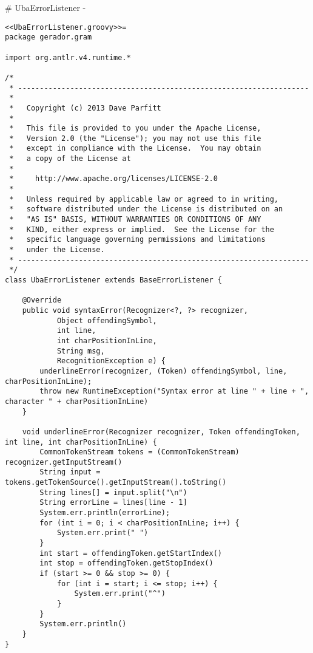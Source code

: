 # UbaErrorListener {-}

\begin{lstlisting}[style=java]
<<UbaErrorListener.groovy>>=
package gerador.gram

import org.antlr.v4.runtime.*

/*
 * -------------------------------------------------------------------
 *
 *   Copyright (c) 2013 Dave Parfitt
 *
 *   This file is provided to you under the Apache License,
 *   Version 2.0 (the "License"); you may not use this file
 *   except in compliance with the License.  You may obtain
 *   a copy of the License at
 *
 *     http://www.apache.org/licenses/LICENSE-2.0
 *
 *   Unless required by applicable law or agreed to in writing,
 *   software distributed under the License is distributed on an
 *   "AS IS" BASIS, WITHOUT WARRANTIES OR CONDITIONS OF ANY
 *   KIND, either express or implied.  See the License for the
 *   specific language governing permissions and limitations
 *   under the License.
 * -------------------------------------------------------------------
 */
class UbaErrorListener extends BaseErrorListener {

    @Override
    public void syntaxError(Recognizer<?, ?> recognizer,
            Object offendingSymbol,
            int line,
            int charPositionInLine,
            String msg,
            RecognitionException e) {
        underlineError(recognizer, (Token) offendingSymbol, line, charPositionInLine);
        throw new RuntimeException("Syntax error at line " + line + ", character " + charPositionInLine)
    }

    void underlineError(Recognizer recognizer, Token offendingToken, int line, int charPositionInLine) {
        CommonTokenStream tokens = (CommonTokenStream) recognizer.getInputStream()
        String input = tokens.getTokenSource().getInputStream().toString()
        String lines[] = input.split("\n")
        String errorLine = lines[line - 1]
        System.err.println(errorLine);
        for (int i = 0; i < charPositionInLine; i++) {
            System.err.print(" ")
        }
        int start = offendingToken.getStartIndex()
        int stop = offendingToken.getStopIndex()
        if (start >= 0 && stop >= 0) {
            for (int i = start; i <= stop; i++) {
                System.err.print("^")
            }
        }
        System.err.println()
    }
}

\end{lstlisting}
